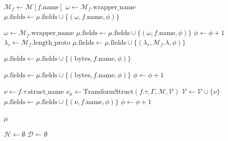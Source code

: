 \begin{algorithm}[H]
\begin{algorithmic}[1]
                \STATE $\mathcal{M}_f \leftarrow \mathcal{M}[f.\text{name}]$ 
                    \STATE $\omega \leftarrow \mathcal{M}_f.\text{wrapper\_name}$ 
                    \STATE $\mu.\text{fields} \leftarrow \mu.\text{fields} \cup \{(\omega, f.\text{name}, \phi)\}$

                    \STATE $\omega \leftarrow \mathcal{M}_f.\text{wrapper\_name}$ 
                    \STATE $\mu.\text{fields} \leftarrow \mu.\text{fields} \cup \{(\omega, f.\text{name}, \phi)\}$
                    \STATE $\phi \leftarrow \phi + 1$
                    \STATE {}
                    \STATE $\lambda_{\tau} \leftarrow \mathcal{M}_f.\text{length\_proto}$
                    \STATE $\mu.\text{fields} \leftarrow \mu.\text{fields} \cup \{(\lambda_{\tau}, \mathcal{M}_f.\lambda, \phi)\}$

                    \STATE $\mu.\text{fields} \leftarrow \mu.\text{fields} \cup \{(\text{bytes}, f.\text{name}, \phi)\}$

                \ELSE
                    \STATE $\mu.\text{fields} \leftarrow \mu.\text{fields} \cup \{(\text{bytes}, f.\text{name}, \phi)\}$ 
                \ENDIF
            \ENDIF
            \STATE $\phi \leftarrow \phi + 1$

            \STATE $\nu \leftarrow f.\tau.\text{struct\_name}$
                \STATE $\nu_{\mu} \leftarrow \text{TransformStruct}(f.\tau, \Gamma, \mathcal{M}, \mathcal{V})$ 
                \STATE $\mathcal{V} \leftarrow \mathcal{V} \cup \{\nu\}$
            \ENDIF
            \STATE $\mu.\text{fields} \leftarrow \mu.\text{fields} \cup \{(\nu, f.\text{name}, \phi)\}$
            \STATE $\phi \leftarrow \phi + 1$
        \ENDIF
    \ENDFOR

    \RETURN $\mu$
\ENDPROCEDURE

\vspace{0.3cm}

    \STATE $\mathcal{H} \leftarrow \emptyset$ 
    \STATE $\mathcal{D} \leftarrow \emptyset$ 


\end{algorithmic}
\end{algorithm}
